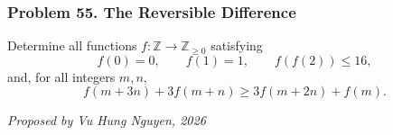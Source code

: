 \subsubsection*{Problem 55. The Reversible Difference}

\begin{exercisebox}[medium]

Determine all functions $f:\mathbb Z\to\mathbb Z_{\ge0}$ satisfying
\[
f(0)=0,\qquad f(1)=1,\qquad f(f(2))\le16,
\]
and, for all integers $m,n$,
\[
\boxed{\qquad
f(m+3n)+3f(m+n)
\ge 3f(m+2n)+f(m).
\qquad}
\]

\begin{flushright}
\textit{Proposed by Vu Hung Nguyen, 2026}
\end{flushright}


\end{exercisebox}
